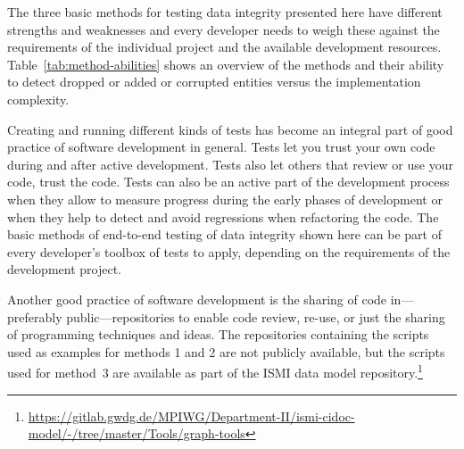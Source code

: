 \documentclass[final]{anthology-ch} %
\begin{document}
The three basic methods for testing data integrity presented here have different strengths and weaknesses and every developer needs to weigh these against the requirements of the individual project and the available development resources. Table~\ref{tab:method-abilities} shows an overview of the methods and their ability to detect dropped or added or corrupted entities versus the implementation complexity.

Creating and running different kinds of tests has become an integral part of good practice of software development in general. Tests let you trust your own code during and after active development. Tests also let others that review or use your code, trust the code. Tests can also be an active part of the development process when they allow to measure progress during the early phases of development or when they help to detect and avoid regressions when refactoring the code. The basic methods of end-to-end testing of data integrity shown here can be part of every developer's toolbox of tests to apply, depending on the requirements of the development project.

Another good practice of software development is the sharing of code in---preferably public---repositories to enable code review, re-use, or just the sharing of programming techniques and ideas. The repositories containing the scripts used as examples for methods 1 and 2 are not publicly available, but the scripts used for method~3 are available as part of the ISMI data model repository.\footnote{\url{https://gitlab.gwdg.de/MPIWG/Department-II/ismi-cidoc-model/-/tree/master/Tools/graph-tools}}


\printbibliography

\end{document}
